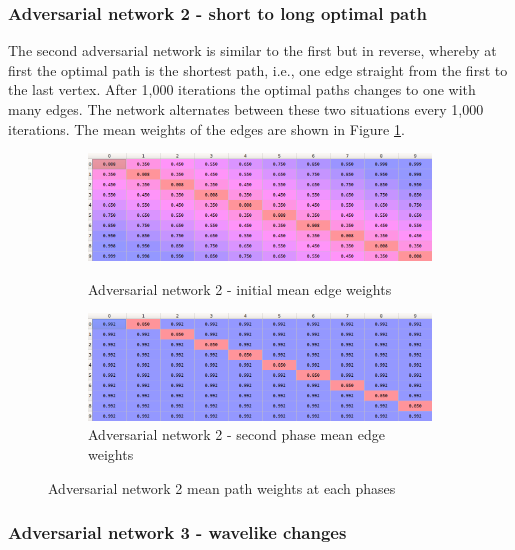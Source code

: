 \subsubsection{Adversarial network 2 - short to long optimal path}

The second adversarial network is similar to the first but in reverse, whereby at first the optimal path is the shortest path, i.e., one edge straight from the first to the last vertex. After 1,000 iterations the optimal paths changes to one with many edges. The network alternates between these two situations every 1,000 iterations. The mean weights of the edges are shown in Figure \ref{fig:adv_net2}.\\

\begin{figure}[ht!]
\centering
\begin{subfigure}{1.0\textwidth}
  \centering
  \includegraphics[width=14cm]{../plots/path_means3.png}
  \caption{Adversarial network 2 - initial mean edge weights}
  \includegraphics[width=14cm]{../plots/path_means4.png}
  \caption{Adversarial network 2 - second phase mean edge weights}
\end{subfigure}
\caption{Adversarial network 2 mean path weights at each phases}
\label{fig:adv_net2}
\end{figure}



\subsubsection{Adversarial network 3 - wavelike changes}

